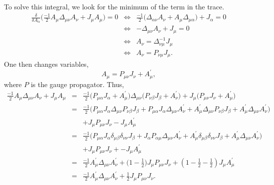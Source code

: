 \documentclass[a4paper,11pt]{article} %
\numberwithin{equation}{section} %
\numberwithin{figure}{section} %
\theoremstyle{plain} %
\theoremstyle{definition} %
\theoremstyle{remark} %
\begin{document}
To solve this integral, we look for the minimum of the term in the trace.
\begin{eqnarray*}
 \frac{\delta}{\delta A_{\alpha}} \Big( \frac{-1}{2} A_{\mu} \Delta_{\mu \nu} A_{\nu} + J_{\mu} A_{\mu} \Big) = 0 &\Leftrightarrow& \frac{-1}{2} \Big( \Delta_{\alpha \nu} A_{\nu} + A_{\mu} \Delta_{\mu \alpha} \Big) + J_{\alpha} = 0\\
                   &\Leftrightarrow& - \Delta_{\mu \nu} A_{\nu} + J_{\mu} = 0 \\
                   &\Leftrightarrow& A_{\nu} = \Delta_{\nu \mu}^{-1} J_{\mu} \\
                   &\Leftrightarrow& A_{\nu} = P_{\nu \mu} J_{\mu}.
\end{eqnarray*}
One then changes variables,
\begin{equation*}
 A_{\mu} = P_{\mu \nu} J_{\nu} + A^{'}_{\mu},
\end{equation*}
where $P$ is the gauge propagator. Thus,
\begin{eqnarray*} 
\frac{-1}{2} A_{\mu} \Delta_{\mu \nu} A_{\nu} + J_{\mu} A_{\mu} &=& \frac{-1}{2} \Big( P_{\mu \alpha} J_{\alpha} + A^{'}_{\mu} \Big) \Delta_{\mu \nu} \Big( P_{\nu \beta} J_{\beta} + A^{'}_{\nu} \Big) + J_{\mu} \Big( P_{\mu \nu} J_{\nu} + A^{'}_{\mu} \Big) \\
                                                                &=& \frac{-1}{2} \Big( P_{\mu \alpha} J_{\alpha} \Delta_{\mu \nu} P_{\nu \beta} J_{\beta} + P_{\mu \alpha} J_{\alpha} \Delta_{\mu \nu} A^{'}_{\nu} + A^{'}_{\mu} \Delta_{\mu \nu} P_{\nu \beta} J_{\beta} + A^{'}_{\mu} \Delta_{\mu \nu} A^{'}_{\nu}\Big) \\
                                                                && + J_{\mu} P_{\mu \nu} J_{\nu} - J_{\mu} A^{'}_{\mu} \\
                                                                &=& \frac{-1}{2} \Big( P_{\mu \alpha} J_{\alpha} \delta_{\mu \beta} \delta_{\nu \nu} J_{\beta} + J_{\alpha} P_{\alpha \mu} \Delta_{\mu \nu} A^{'}_{\nu} + A^{'}_{\mu} \delta_{\mu \beta} \delta_{\nu \nu} J_{\beta} + A^{'}_{\mu} \Delta_{\mu \nu} A^{'}_{\nu}\Big) \\
                                                                && + J_{\mu} P_{\mu \nu} J_{\nu} +- J_{\mu} A^{'}_{\mu} \\
                                                                &=& \frac{-1}{2} A^{'}_{\mu} \Delta_{\mu \nu} A^{'}_{\nu} + \big( 1 - \frac{1}{2} \big) J_{\mu} P_{\mu \nu} J_{\nu} + (1 - \frac{1}{2} - \frac{1}{2} ) J_{\mu} A^{'}_{\mu} \\
                                                                &=& \frac{-1}{2} A^{'}_{\mu} \Delta_{\mu \nu} A^{'}_{\nu} + \frac{1}{2} J_{\mu} P_{\mu \nu} J_{\nu}. 
\end{eqnarray*}
\end{document}
